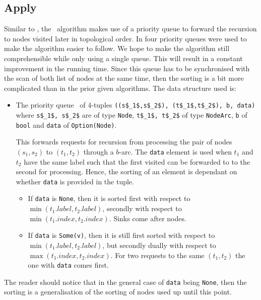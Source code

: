 \subsection{Apply}
Similar to \Restrict, the \Apply\ algorithm makes use of a priority queue to
forward the recursion to nodes visited later in topological order. In
\cite{Arge96} four priority queues were used to make the algorithm easier to
follow. We hope to make the algorithm still comprehensible while only using a
single queue. This will result in a constant improvement in the running time.
Since this queue has to be synchronised with the scan of both list of nodes at
the same time, then the sorting is a bit more complicated than in the prior
given algorithms. The data structure used is:
\begin{itemize}
\item The priority queue \ApplyQrec\ of 4-tuples \lstinline{((s$_1$,s$_2$), (t$_1$,t$_2$), b, data)}
  where \lstinline{s$_1$, s$_2$} are of type \lstinline{Node}, \lstinline{t$_1$, t$_2$}
  of type \lstinline{NodeArc}, \lstinline{b} of \lstinline{bool} and
  \lstinline{data} of \lstinline{Option(Node)}.

  This forwards requests for recursion from processing the pair of nodes $(s_1,
  s_2)$ to $(t_1,t_2)$ through a $b$-arc. The \lstinline{data} element is used
  when $t_1$ and $t_2$ have the same label such that the first visited can be
  forwarded to to the second for processing. Hence, the sorting of an element is
  dependant on whether \lstinline{data} is provided in the tuple.

  \begin{itemize}
  \item If \lstinline{data} is \lstinline{None}, then it is sorted first with
    respect to $\min(t_1.\mathit{label},t_2.\mathit{label})$, secondly with
    respect to $\min(t_1.\mathit{index},t_2.\mathit{index})$. Sinks come after
    nodes.

  \item If \lstinline{data} is \lstinline{Some(v)}, then it is still first
    sorted with respect to $\min(t_1.\mathit{label},t_2.\mathit{label})$, but
    secondly dually with respect to $\max(t_1.\mathit{index},
    t_2.\mathit{index})$. For two requests to the same $(t_1,t_2)$ the one with
    \lstinline{data} comes first.
  \end{itemize}
\end{itemize}
The reader should notice that in the general case of \lstinline{data} being
\lstinline{None}, then the sorting is a generalisation of the sorting of nodes
used up until this point.


